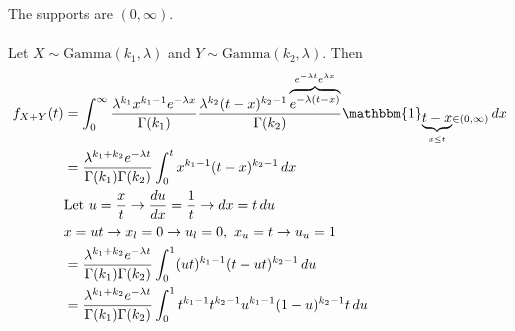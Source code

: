 \documentclass[12pt]{article}
\newcommand{\indicator}[1]{\mathbbm{1}_{#1}}
\begin{document}
The supports are $(0, \infty)$. \\~\\ Let $X \sim \text{Gamma}(k_1, \lambda)$ and $Y \sim \text{Gamma}(k_2, \lambda)$. Then $$\begin{aligned} f_{X + Y} (t) &= \int_0^\infty \frac{\lambda^{k_1} x^{k_1 - 1} e^{-\lambda x}}{\Gamma(k_1)} \frac{\lambda^{k_2}(t - x)^{k_2 - 1} \overbrace{e^{-\lambda(t - x)}}^{e^{-\lambda t} e^{\lambda x}}}{\Gamma(k_2)} \indicator{\underbrace{t - x}_{x \leq t} \in (0, \infty)} \, dx \\ &= \frac{\lambda^{k_1 + k_2} e^{-\lambda t}}{\Gamma(k_1)\Gamma(k_2)}\int_0^t x^{k_1 - 1}(t - x)^{k_2 - 1} \, dx \\ &\text{Let } u = \frac{x}{t} \to \frac{du}{dx} = \frac{1}{t} \to dx = t\, du \\ &x = ut \to x_l = 0 \to u_l = 0,~ x_u = t \to u_u = 1 \\ &= \frac{\lambda^{k_1 + k_2} e^{-\lambda t}}{\Gamma(k_1)\Gamma(k_2)}\int_0^1 (ut)^{k_1 - 1}(t - ut)^{k_2 - 1} \, du \\ &= \frac{\lambda^{k_1 + k_2} e^{-\lambda t}}{\Gamma(k_1)\Gamma(k_2)}\int_0^1 t^{k_1 - 1}t^{k_2 - 1} u^{k_1 - 1} (1 - u)^{k_2 -1 } t \, du \end{aligned} $$ 
\end{document}
